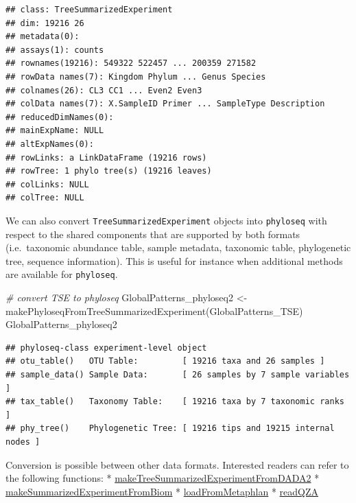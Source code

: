 \documentclass[
]{book}
\newenvironment{Shaded}{\begin{snugshade}}{\end{snugshade}}
\newcommand{\CommentTok}[1]{\textcolor[rgb]{0.56,0.35,0.01}{\textit{#1}}}
\newcommand{\FunctionTok}[1]{\textcolor[rgb]{0.00,0.00,0.00}{#1}}
\newcommand{\NormalTok}[1]{#1}
\newcommand{\OtherTok}[1]{\textcolor[rgb]{0.56,0.35,0.01}{#1}}
\begin{document}
\begin{verbatim}
## class: TreeSummarizedExperiment 
## dim: 19216 26 
## metadata(0):
## assays(1): counts
## rownames(19216): 549322 522457 ... 200359 271582
## rowData names(7): Kingdom Phylum ... Genus Species
## colnames(26): CL3 CC1 ... Even2 Even3
## colData names(7): X.SampleID Primer ... SampleType Description
## reducedDimNames(0):
## mainExpName: NULL
## altExpNames(0):
## rowLinks: a LinkDataFrame (19216 rows)
## rowTree: 1 phylo tree(s) (19216 leaves)
## colLinks: NULL
## colTree: NULL
\end{verbatim}

We can also convert \texttt{TreeSummarizedExperiment} objects into \texttt{phyloseq}
with respect to the shared components that are supported by both
formats (i.e.~taxonomic abundance table, sample metadata, taxonomic
table, phylogenetic tree, sequence information). This is useful for
instance when additional methods are available for \texttt{phyloseq}.

\begin{Shaded}
\begin{Highlighting}[]
\CommentTok{\# convert TSE to phyloseq}
\NormalTok{GlobalPatterns\_phyloseq2 }\OtherTok{\textless{}{-}} \FunctionTok{makePhyloseqFromTreeSummarizedExperiment}\NormalTok{(GlobalPatterns\_TSE) }
\NormalTok{GlobalPatterns\_phyloseq2}
\end{Highlighting}
\end{Shaded}

\begin{verbatim}
## phyloseq-class experiment-level object
## otu_table()   OTU Table:         [ 19216 taxa and 26 samples ]
## sample_data() Sample Data:       [ 26 samples by 7 sample variables ]
## tax_table()   Taxonomy Table:    [ 19216 taxa by 7 taxonomic ranks ]
## phy_tree()    Phylogenetic Tree: [ 19216 tips and 19215 internal nodes ]
\end{verbatim}

Conversion is possible between other data formats. Interested readers can refer to the following functions:
* \href{https://microbiome.github.io/mia/reference/makeTreeSummarizedExperimentFromDADA2.html}{makeTreeSummarizedExperimentFromDADA2}
* \href{https://microbiome.github.io/mia/reference/makeSummarizedExperimentFromBiom.html}{makeSummarizedExperimentFromBiom}
* \href{https://microbiome.github.io/mia/reference/loadFromMetaphlan.html}{loadFromMetaphlan}
* \href{https://microbiome.github.io/mia/reference/loadFromQIIME2.html}{readQZA}
\end{document}
